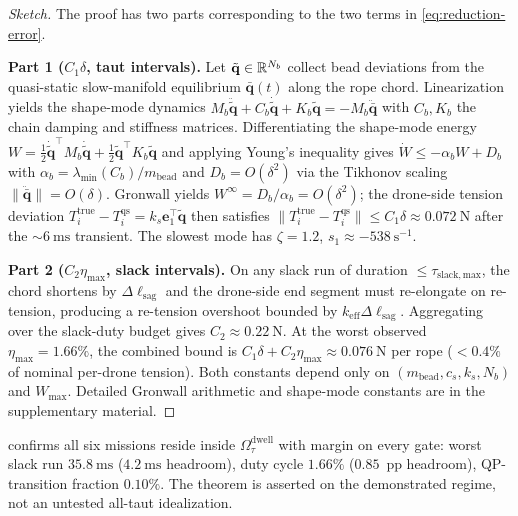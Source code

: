 \begin{proof}[Sketch]
The proof has two parts corresponding to the two terms in \eqref{eq:reduction-error}.

\noindent\textbf{Part 1 ($C_1\delta$, taut intervals).} Let $\tilde{\mathbf{q}}\in\mathbb{R}^{N_b}$ collect bead deviations from the quasi-static slow-manifold equilibrium $\bar{\mathbf{q}}(t)$ along the rope chord. Linearization yields the shape-mode dynamics $M_b\ddot{\tilde{\mathbf{q}}}+C_b\dot{\tilde{\mathbf{q}}}+K_b\tilde{\mathbf{q}}=-M_b\ddot{\bar{\mathbf{q}}}$ with $C_b,K_b$ the chain damping and stiffness matrices. Differentiating the shape-mode energy $W=\tfrac12\dot{\tilde{\mathbf{q}}}^\top M_b\dot{\tilde{\mathbf{q}}}+\tfrac12\tilde{\mathbf{q}}^\top K_b\tilde{\mathbf{q}}$ and applying Young's inequality gives $\dot W\le -\alpha_b W + D_b$ with $\alpha_b=\lambda_{\min}(C_b)/m_{\mathrm{bead}}$ and $D_b=O(\delta^2)$ via the Tikhonov scaling $\|\ddot{\bar{\mathbf{q}}}\|=O(\delta)$. Gronwall yields $W^\infty=D_b/\alpha_b=O(\delta^2)$; the drone-side tension deviation $T_i^{\mathrm{true}}-T_i^{\mathrm{qs}}=k_s\mathbf{e}_1^\top\tilde{\mathbf{q}}$ then satisfies $\|T_i^{\mathrm{true}}-T_i^{\mathrm{qs}}\|\le C_1\delta\approx\SI{0.072}{\newton}$ after the $\sim\SI{6}{\milli\second}$ transient. The slowest mode has $\zeta=1.2$, $s_1\approx-\SI{538}{\second^{-1}}$.

\noindent\textbf{Part 2 ($C_2\eta_{\max}$, slack intervals).} On any slack run of duration $\le\tau_{\mathrm{slack,max}}$, the chord shortens by $\Delta\ell_{\mathrm{sag}}$ and the drone-side end segment must re-elongate on re-tension, producing a re-tension overshoot bounded by $k_{\mathrm{eff}}\Delta\ell_{\mathrm{sag}}$. Aggregating over the slack-duty budget gives $C_2\approx\SI{0.22}{\newton}$. At the worst observed $\eta_{\max}=1.66\%$, the combined bound is $C_1\delta+C_2\eta_{\max}\approx\SI{0.076}{\newton}$ per rope ($<0.4\%$ of nominal per-drone tension). Both constants depend only on $(m_{\mathrm{bead}},c_s,k_s,N_b)$ and $W_{\max}$. Detailed Gronwall arithmetic and shape-mode constants are in the supplementary material.
\end{proof}

 confirms all six missions reside inside $\Omega_\tau^{\mathrm{dwell}}$ with margin on every gate: worst slack run $\SI{35.8}{\milli\second}$ ($\SI{4.2}{\milli\second}$ headroom), duty cycle $1.66\%$ ($0.85$~pp headroom), QP-transition fraction $0.10\%$. The theorem is asserted on the demonstrated regime, not an untested all-taut idealization.

